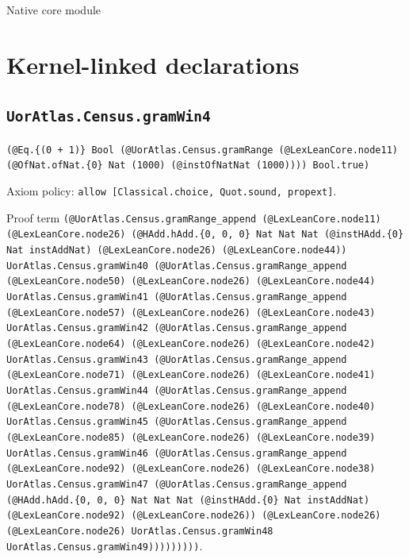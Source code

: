 \documentclass[11pt]{article}
\begin{document}
\begin{center}{\LARGE Native core module}\end{center}
\section*{Kernel-linked declarations}
\subsection*{\texttt{UorAtlas.Census.gramWin4}}
\noindent\texttt{(@Eq.\{(0 + 1)\} Bool (@UorAtlas.Census.gramRange (@LexLeanCore.node11) (@OfNat.ofNat.\{0\} Nat (1000) (@instOfNatNat (1000)))) Bool.true)}\par
\noindent Axiom policy: \texttt{allow [Classical.choice, Quot.sound, propext]}.\par
\noindent Proof term \texttt{(@UorAtlas.Census.gramRange\_append (@LexLeanCore.node11) (@LexLeanCore.node26) (@HAdd.hAdd.\{0, 0, 0\} Nat Nat Nat (@instHAdd.\{0\} Nat instAddNat) (@LexLeanCore.node26) (@LexLeanCore.node44)) UorAtlas.Census.gramWin40 (@UorAtlas.Census.gramRange\_append (@LexLeanCore.node50) (@LexLeanCore.node26) (@LexLeanCore.node44) UorAtlas.Census.gramWin41 (@UorAtlas.Census.gramRange\_append (@LexLeanCore.node57) (@LexLeanCore.node26) (@LexLeanCore.node43) UorAtlas.Census.gramWin42 (@UorAtlas.Census.gramRange\_append (@LexLeanCore.node64) (@LexLeanCore.node26) (@LexLeanCore.node42) UorAtlas.Census.gramWin43 (@UorAtlas.Census.gramRange\_append (@LexLeanCore.node71) (@LexLeanCore.node26) (@LexLeanCore.node41) UorAtlas.Census.gramWin44 (@UorAtlas.Census.gramRange\_append (@LexLeanCore.node78) (@LexLeanCore.node26) (@LexLeanCore.node40) UorAtlas.Census.gramWin45 (@UorAtlas.Census.gramRange\_append (@LexLeanCore.node85) (@LexLeanCore.node26) (@LexLeanCore.node39) UorAtlas.Census.gramWin46 (@UorAtlas.Census.gramRange\_append (@LexLeanCore.node92) (@LexLeanCore.node26) (@LexLeanCore.node38) UorAtlas.Census.gramWin47 (@UorAtlas.Census.gramRange\_append (@HAdd.hAdd.\{0, 0, 0\} Nat Nat Nat (@instHAdd.\{0\} Nat instAddNat) (@LexLeanCore.node92) (@LexLeanCore.node26)) (@LexLeanCore.node26) (@LexLeanCore.node26) UorAtlas.Census.gramWin48 UorAtlas.Census.gramWin49)))))))))}.\par
\end{document}
